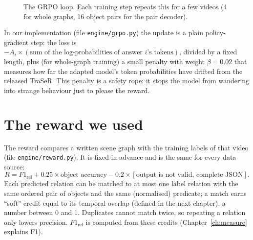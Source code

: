 \documentclass[11pt,openany]{book}
\newcommand{\code}[1]{\texttt{#1}}
\begin{document}
\begin{figure}[h]
\centering
{}
\caption{The GRPO loop. Each training step repeats this for a few videos (4 for whole graphs, 16 object pairs for the pair
decoder).}
\label{fig:grpo}
\end{figure}

In our implementation (file \code{engine/grpo.py}) the update is a plain policy-gradient step: the loss is
$-A_i \times(\text{sum of the log-probabilities of answer $i$'s tokens})$, divided by a fixed length, plus (for whole-graph
training) a small penalty with weight $\beta=0.02$ that measures how far the adapted model's token probabilities have drifted from
the released TraSeR. This penalty is a safety rope: it stops the model from wandering into strange behaviour just to please the
reward.

\section{The reward we used}
The reward compares a written scene graph with the training labels of that video (file \code{engine/reward.py}). It is fixed in
advance and is the same for every data source:
\[ R = F1_{\text{rel}} + 0.25 \times \text{object accuracy} - 0.2\times[\text{output is not valid, complete JSON}]. \]
Each predicted relation can be matched to at most one label relation with the same ordered pair of objects and the same
(normalised) predicate; a match earns ``soft'' credit equal to its temporal overlap (defined in the next chapter), a number between
0 and 1. Duplicates cannot match twice, so repeating a relation only lowers precision. $F1_{\text{rel}}$ is computed from these
credits (Chapter~\ref{ch:measure} explains F1).
\end{document}
